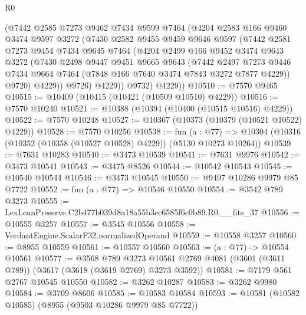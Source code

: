 \begin{lexlean}{R0}
\begin{coremodule}
          (@7442
            @2585
            @7273
            @9462
            @7434
            @9599
            @7464
            (@4204
              @2583
              @166
              @9460
              @3474
              @9597
              @3272
              (@7430
                @2582
                @9455
                @9459
                @9646
                @9597
                (@7442
                  @2581
                  @7273
                  @9454
                  @7434
                  @9645
                  @7464
                  (@4204
                    @2499
                    @166
                    @9452
                    @3474
                    @9643
                    @3272
                    (@7430
                      @2498
                      @9447
                      @9451
                      @9665
                      @9643
                      (@7442
                        @2497
                        @7273
                        @9446
                        @7434
                        @9664
                        @7464
                        (@7848 @166 @7640 @3474 @7843 @3272 @7877 @4229))
                      @9720)
                    @4229))
                @9726)
              @4229))
          @9732)
        @4229))
@10510 := @7570 @9465
@10515 := @10409 (@10415 (@10421 (@10509 @10510) @4229))
@10516 := @7570 @10240
@10521 := @10388 (@10394 (@10400 (@10515 @10516) @4229))
@10522 := @7570 @10248
@10527 := @10367 (@10373 (@10379 (@10521 @10522) @4229))
@10528 := @7570 @10256
@10538 := fun (a : @77) =>
  @10304 (@10316 (@10352 (@10358 (@10527 @10528) @4229)) (@5130 @10273 @10264))
@10539 := @7631 @10283
@10540 := @3473 @10539
@10541 := @7631 @9976
@10542 := @3473 @10541
@10543 := @3475 @8526
@10544 := @10542 @10543
@10545 := @10540 @10544
@10546 := @3473 @10545
@10550 := @9497 @10286 @9979 @85 @7722
@10552 := fun (a : @77) => @10546 @10550
@10554 := @3542 @789 @3273
@10555 := LexLeanPreserve.C2b477b039d8a18a55b3ec6585f6c0b89.R0.__fits_37
@10556 := @10555 @3257
@10557 := @3545 @10556
@10558 := VerdantEngine.ScalarF32.normalizedOperand
@10559 := @10558 @3257
@10560 := @8955 @10559
@10561 := @10557 @10560
@10563 := (a : @77) -> @10554 @10561
@10577 := @3568
    @789
    @3273
    @10561
    @2769
    @4081
    (@3601 (@3611 @789))
    (@3617 (@3618 (@3619 @2769) @3273 @3592))
@10581 := @7179 @561 @2767 @10545 @10550
@10582 := @3262 @10287
@10583 := @3262 @9980
@10584 := @3709 @8606
@10585 := @10583 @10584
@10593 := @10581 (@10582 @10585) (@8955 (@9503 @10286 @9979 @85 @7722))

\end{coremodule}
\end{lexlean}
